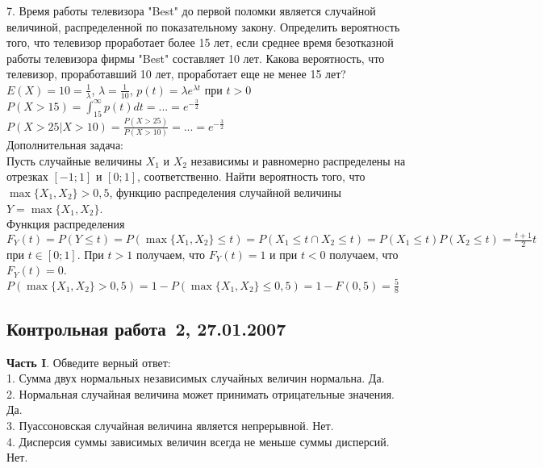 \documentclass[pdftex,12pt,a4paper]{article}
\begin{document}
7.  Время работы телевизора "Best" до первой поломки является
случайной величиной, распределенной по показательному закону.
Определить вероятность того, что телевизор проработает более 15
лет, если среднее время безотказной работы телевизора фирмы "Best"
составляет 10 лет. Какова вероятность, что телевизор,
проработавший 10 лет, проработает еще не менее 15 лет? \\

$E(X)=10=\frac{1}{\lambda}$, $\lambda=\frac{1}{10}$, $p(t)=\lambda
e^{\lambda t}$ при $t>0$ \\
$P(X>15)=\int_{15}^{\infty}p(t)dt=...=e^{-\frac{3}{2}}$ \\
$P(X>25|X>10)=\frac{P(X>25)}{P(X>10)}=...=e^{-\frac{3}{2}}$ \\

Дополнительная задача: \\
Пусть случайные величины $X_{1}$ и $X_{2}$ независимы и равномерно
распределены на отрезках $[-1;1]$ и $[0;1]$, соответственно. Найти
вероятность того, что $\max\{X_{1},X_{2}\}>0,5$, функцию
распределения случайной величины $Y=\max\{X_{1},X_{2}\}$. \\
Функция распределения $F_{Y}(t)=P(Y\le t)=P(\max\{X_{1},X_{2}\}\le
t)=P(X_{1}\le t\cap X_{2}\le t)=P(X_{1}\le t)P(X_{2}\le
t)=\frac{t+1}{2}t$ при $t\in [0;1]$. При $t>1$ получаем, что
$F_{Y}(t)=1$ и при $t<0$ получаем, что $F_{Y}(t)=0$. \\
$P(\max\{X_{1},X_{2}\}>0,5)=1-P(\max\{X_{1},X_{2}\}\le
0,5)=1-F(0,5)=\frac{5}{8}$ \\




\subsection{Контрольная работа \No\,2, 27.01.2007}

 \textbf{Часть I}. Обведите верный ответ: \\

1. Сумма двух нормальных независимых случайных величин нормальна.
Да. \\

2. Нормальная случайная величина может принимать отрицательные
значения. Да. \\

3. Пуассоновская случайная величина является непрерывной. Нет.
\\

4. Дисперсия суммы зависимых величин всегда не меньше суммы
дисперсий. Нет. \\
\end{document}

